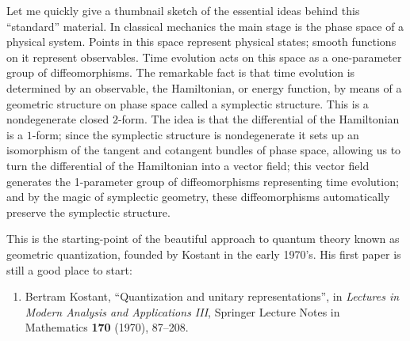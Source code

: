 \documentclass[12pt]{article}
\def\tightlist{}
\begin{document}
Let me quickly give a thumbnail sketch of the essential ideas behind
this ``standard'' material. In classical mechanics the main stage is the
phase space of a physical system. Points in this space represent
physical states; smooth functions on it represent observables. Time
evolution acts on this space as a one-parameter group of
diffeomorphisms. The remarkable fact is that time evolution is
determined by an observable, the Hamiltonian, or energy function, by
means of a geometric structure on phase space called a symplectic
structure. This is a nondegenerate closed \(2\)-form. The idea is that
the differential of the Hamiltonian is a \(1\)-form; since the
symplectic structure is nondegenerate it sets up an isomorphism of the
tangent and cotangent bundles of phase space, allowing us to turn the
differential of the Hamiltonian into a vector field; this vector field
generates the 1-parameter group of diffeomorphisms representing time
evolution; and by the magic of symplectic geometry, these
diffeomorphisms automatically preserve the symplectic structure.

This is the starting-point of the beautiful approach to quantum theory
known as geometric quantization, founded by Kostant in the early 1970's.
His first paper is still a good place to start:

\begin{enumerate}
\def\labelenumi{\arabic{enumi})}
\setcounter{enumi}{1}
\tightlist
\item
  Bertram Kostant, ``Quantization and unitary representations'', in
  \emph{Lectures in Modern Analysis and Applications III},
  Springer Lecture Notes in Mathematics \textbf{170} (1970),
  87--208.
\end{enumerate}
\end{document}
